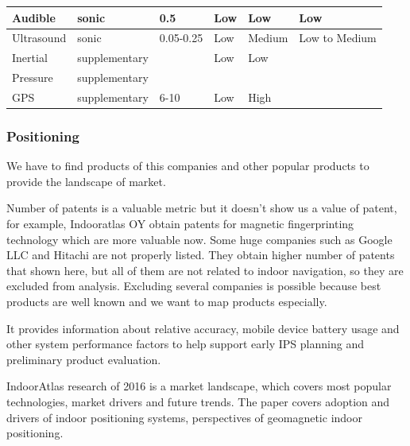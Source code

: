 \begin{table}[h!]
{\begin{tabular}{|l|l|l|l|l|l|}
Audible                       & sonic          & 0.5                  & Low                  & Low                 & Low           \\ \hline
Ultrasound                    & sonic          & 0.05-0.25            & Low                  & Medium              & Low to Medium \\ \hline
Inertial                      & supplementary  &                      & Low                  & Low                 &               \\ \hline
Pressure                      & supplementary  &                      &                      &                     &               \\ \hline
GPS                           & supplementary  & 6-10                 & Low                  & High                &               \\ \hline
\end{tabular}%
}
\end{table}


\subsubsection{Positioning}

We have to find products of this companies and other popular products to provide the landscape of market.


Number of patents is a valuable metric but it doesn't show us a value of patent, for example, Indooratlas OY obtain patents for magnetic fingerprinting technology which are more valuable now. Some huge companies such as Google LLC and Hitachi are not properly listed. They obtain higher number of patents that shown here, but all of them are not related to indoor navigation, so they are excluded from analysis. Excluding several companies is possible because best products are well known and we want to map products especially.

\cite{Security} It provides information about relative accuracy, mobile device battery usage and other system performance factors to help support early IPS planning and preliminary product evaluation.

\cite{Mautz2012IndoorPT}

IndoorAtlas research of 2016\cite{IPTrise} is a market landscape, which covers most popular technologies, market drivers and future trends. The paper covers adoption and drivers of indoor positioning systems, perspectives of geomagnetic indoor positioning.

